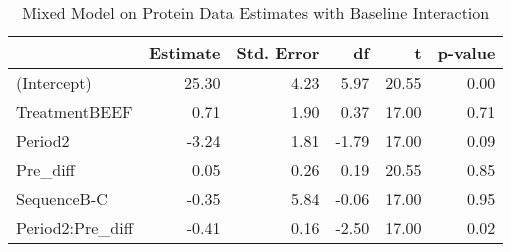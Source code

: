 \begin{table}[hbt]

\caption{\label{tab:proteinDataEstimates}Mixed Model on Protein Data Estimates with Baseline Interaction}
\centering
\begin{tabular}[t]{>{}l|rrrrr}
\toprule
 & Estimate & Std. Error & df & t & p-value\\
\midrule
(Intercept) & 25.30 & 4.23 & 5.97 & 20.55 & 0.00\\
TreatmentBEEF & 0.71 & 1.90 & 0.37 & 17.00 & 0.71\\
Period2 & -3.24 & 1.81 & -1.79 & 17.00 & 0.09\\
Pre\_diff & 0.05 & 0.26 & 0.19 & 20.55 & 0.85\\
SequenceB-C & -0.35 & 5.84 & -0.06 & 17.00 & 0.95\\
Period2:Pre\_diff & -0.41 & 0.16 & -2.50 & 17.00 & 0.02\\
\bottomrule
\end{tabular}
\end{table}
